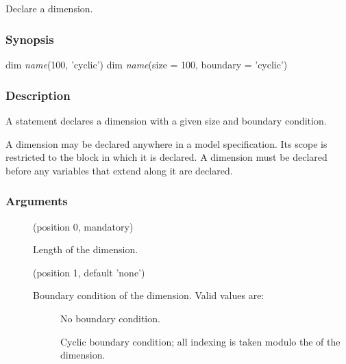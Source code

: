 \subsection{\label{dim}}

Declare a dimension.

\subsubsection*{Synopsis\label{dim_Synopsis}}
\begin{bicode}
dim \textsl{name}(100, 'cyclic')
dim \textsl{name}(size = 100, boundary = 'cyclic')
\end{bicode}

\subsubsection*{Description\label{dim_Description}}

A  statement declares a dimension with a given size and boundary
condition.

A dimension may be declared anywhere in a model
specification. Its scope is restricted to the block in which it is
declared. A dimension must be declared before any variables that
extend along it are declared.

\subsubsection*{Arguments\label{dim_Arguments}}

\begin{description}
\item[] (position 0, mandatory)

Length of the dimension.

\item[] (position 1, default 'none')

Boundary condition of the dimension. Valid values are:

\begin{description}
\item[]

No boundary condition.

\item[]

Cyclic boundary condition; all indexing is taken modulo the  of
the dimension.
\end{description}
\end{description}

